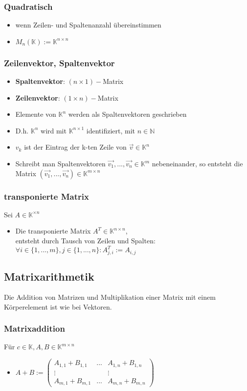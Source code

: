\documentclass[titlepage]{article}
\newcommand{\K}{\mathbb{K}}
\newcommand{\N}{\mathbb{N}}
\newcommand{\1}{\mathbb{1}}
\newcommand{\0}{\mathbb{0}}
\begin{document}
				\subsubsection{Quadratisch}
					\begin{itemize}
						\item wenn Zeilen- und Spaltenanzahl übereinstimmen
						\item $M_n(\K):=\K^{n\times n}$
					\end{itemize}
				\subsubsection{Zeilenvektor, Spaltenvektor}
					\begin{itemize}
						\item \textbf{Spaltenvektor}: $(n\times1)-$Matrix
						\item \textbf{Zeilenvektor}: $(1\times n)-$Matrix\\
						\item Elemente von $\K^n$ werden als Spaltenvektoren geschrieben
						\item D.h. $\K^n$ wird mit $\K^{n\times1}$ identifiziert, mit $n\in\N$
						\item $v_k$ ist der Eintrag der k-ten Zeile von $\vec{v}\in\K^n$
						\item Schreibt man Spaltenvektoren $\vec{v_1},...,\vec{v_n}\in\K^m$ nebeneinander, so entsteht die Matrix $(\vec{v_1},...,\vec{v_n})\in\K^{m\times n}$
					\end{itemize}
				\subsubsection{transponierte Matrix}
					Sei $A\in\K^{\times n}$
					\begin{itemize}
						\item Die transponierte Matrix $A^T\in\K^{n\times n}$, \\entsteht durch Tausch von Zeilen und Spalten: $\forall i\in\{1,...,m\},j\in\{1,...,n\}:A^T_{j,i}:=A_{i,j}$
					\end{itemize}
			\subsection{Matrixarithmetik}
				Die Addition von Matrizen und Multiplikation einer Matrix mit einem Körperelement ist wie bei Vektoren.
				\subsubsection{Matrixaddition}
					Für $c\in\K,A,B\in\K^{m\times n}$
					\begin{itemize}
						\item $A+B:=\begin{pmatrix}
							A_{1,1}+B_{1,1}&...&A_{1,n}+B_{1,n}\\
							\vdots&&\vdots\\
							A_{m,1}+B_{m,1}&...&A_{m,n}+B_{m,n}
						\end{pmatrix}$
					\end{itemize}
\end{document}
